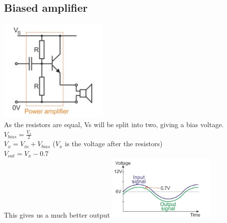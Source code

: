 \documentclass[a4paper, 11pt, twocolumn]{article}
\begin{document}
    \subsection{Biased amplifier}
    \includegraphics[width=0.4\textwidth]{biasedAmp.jpg}\\
    As the resistors are equal, Vs will be split into two, giving a bias voltage.\\
    $\displaystyle V_{bias} = \frac{V_s}{2}$\\
    $\displaystyle V_x = V_{in} + V_{bias}$ ($V_x$ is the voltage after the resistors) \\
    $V_{out} = V_x - 0.7$ \\
    This gives us a much better output
    \includegraphics[width=0.4\textwidth]{biasOut.jpg} \\
\end{document}
